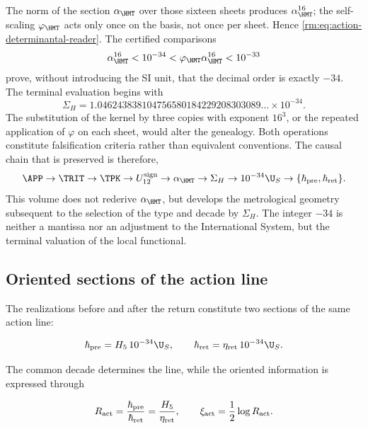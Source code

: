 The norm of the section \(\alpha_{\HMT}\) over those sixteen sheets
produces \(\alpha_{\HMT}^{16}\); the self-scaling \(\varphi_{\HMT}\) acts
only once on the basis, not once per sheet. Hence
\cref{rm:eq:action-determinantal-reader}. The certified comparisons
\begin{equation}
\alpha_{\HMT}^{16}<10^{-34}
<\varphi_{\HMT}\alpha_{\HMT}^{16}<10^{-33}
\label{rm:eq:action-decade-bounds}
\end{equation}
prove, without introducing the SI unit, that the decimal order is
exactly \(-34\). The terminal evaluation begins with
\begin{equation}
\Sigma_H
=1.046243838104756580184229208303089\ldots\times10^{-34}.
\label{rm:eq:action-sigma-value}
\end{equation}
The substitution of the kernel by three copies with exponent \(16^3\), or the repeated application of \(\varphi\) on each sheet, would alter the genealogy. Both operations constitute falsification criteria rather than equivalent conventions. The causal chain that is preserved is therefore,
\[
\APP\to\TRIT\to\TPK\to U_{12}^{\rm sign}
\to\alpha_{\HMT}\to\Sigma_H
\to10^{-34}\U_S\to
\{\hbar_{\rm pre},\hbar_{\rm ret}\}.
\]
This volume does not rederive \(\alpha_{\HMT}\), but develops the metrological geometry
subsequent to the selection of the type and decade by
\(\Sigma_H\). The integer \(-34\) is neither a mantissa nor an adjustment to the International
System, but the terminal valuation of the local functional.

\subsection{Oriented sections of the action line}

The realizations before and after the return constitute two sections
of the same action line:

\begin{equation}
\hbar_{\rm pre}=H_5\,10^{-34}\U_S,\qquad
\hbar_{\rm ret}=\eta_{\rm ret}\,10^{-34}\U_S.
\label{rm:eq:action-twoway}
\end{equation}

The common decade determines the line, while the oriented
information is expressed through

\begin{equation}
R_{\rm act}=\frac{\hbar_{\rm pre}}{\hbar_{\rm ret}}
=\frac{H_5}{\eta_{\rm ret}},
\qquad
\xi_{\rm act}=\frac12\log R_{\rm act}.
\label{rm:eq:action-rapidity}
\end{equation}

